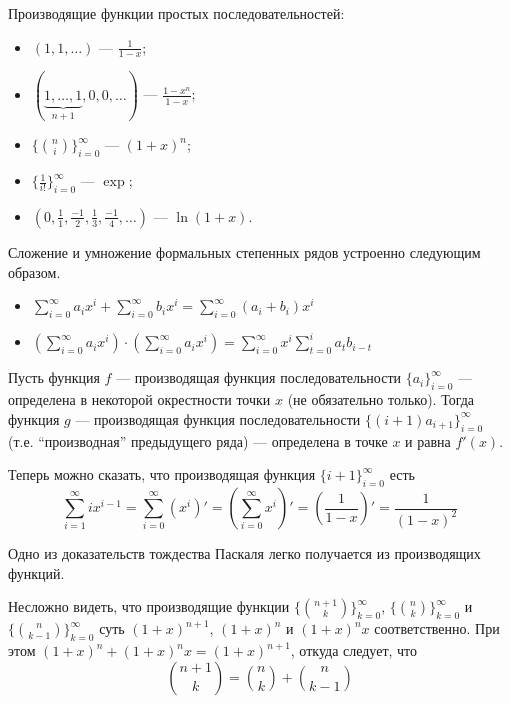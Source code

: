 \documentclass[12pt,a4paper]{article}
\begin{document}
    \begin{example}
        Производящие функции простых последовательностей:
        \begin{itemize}
            \item $(1, 1, \dots)$ --- $\frac{1}{1-x}$;
            \item $(\underbrace{1, \dots, 1}_{n+1}, 0, 0, \dots)$ --- $\frac{1-x^n}{1-x}$;
            \item $\{\binom{n}{i}\}_{i=0}^\infty$ --- $(1+x)^n$;
            \item $\{\frac{1}{i!}\}_{i=0}^\infty$ --- $\exp$;
            \item $(0, \frac{1}{1}, \frac{-1}{2}, \frac{1}{3}, \frac{-1}{4}, \dots)$ --- $\ln(1+x)$.
        \end{itemize}
    \end{example}

    \begin{definition}
        Сложение и умножение формальных степенных рядов устроенно следующим образом.
        \begin{itemize}
            \item $\sum_{i=0}^\infty a_i x^i + \sum_{i=0}^\infty b_i x^i = \sum_{i=0}^\infty (a_i + b_i) x^i$
            \item $(\sum_{i=0}^\infty a_i x^i) \cdot (\sum_{i=0}^\infty a_i x^i) = \sum_{i=0}^\infty x^i \sum_{t=0}^i a_t b_{i-t}$
        \end{itemize}
    \end{definition}

    \begin{theorem}
        Пусть функция $f$ --- производящая функция последовательности $\{a_i\}_{i=0}^\infty$ --- определена в некоторой окрестности точки $x$ (не обязательно только). Тогда функция $g$ --- производящая функция последовательности $\{(i+1)a_{i+1}\}_{i=0}^\infty$ (т.е. ``производная'' предыдущего ряда) --- определена в точке $x$ и равна $f'(x)$.
    \end{theorem}

    \begin{corollary}
        Теперь можно сказать, что производящая функция $\{i+1\}_{i=0}^\infty$ есть
        \[\sum_{i=1}^\infty ix^{i-1} = \sum_{i=0}^\infty (x^i)' = \left(\sum_{i=0}^\infty x^i\right)'=\left(\frac{1}{1-x}\right)'=\frac{1}{(1-x)^2}\]
    \end{corollary}

    \begin{corollary}
        Одно из доказательств тождества Паскаля легко получается из производящих функций.

        Несложно видеть, что производящие функции $\{\binom{n+1}{k}\}_{k=0}^\infty$, $\{\binom{n}{k}\}_{k=0}^\infty$ и $\{\binom{n}{k-1}\}_{k=0}^\infty$ суть $(1+x)^{n+1}$, $(1+x)^n$ и $(1+x)^n x$ соответственно. При этом $(1+x)^n + (1+x)^n x = (1+x)^{n+1}$, откуда следует, что
        \[\binom{n+1}{k} = \binom{n}{k} + \binom{n}{k-1}\]
    \end{corollary}
\end{document}
